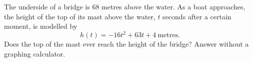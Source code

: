 The underside of a bridge is $68$ metres above the water. As a boat approaches, the height of the top of its mast above the water, $t$ seconds after a certain moment, is modelled by
\[
h(t)=-16t^2+63t+4\ \text{metres}.
\]
Does the top of the mast ever reach the height of the bridge? Answer without a graphing calculator.
